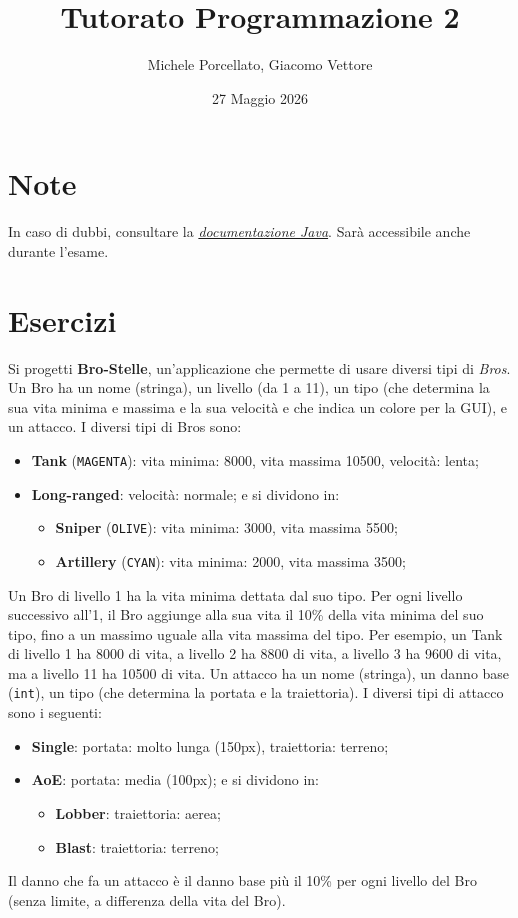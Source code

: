 \documentclass{article}
\title{Tutorato Programmazione 2}
\author{Michele Porcellato, Giacomo Vettore}
\date{27 Maggio 2026}
\begin{document}
\maketitle

\section{Note}
In caso di dubbi, consultare la \href{https://docs.oracle.com/en/java/javase/25/docs/api/index.html}{\textit{documentazione Java}}. Sarà accessibile anche durante l'esame.

\section{Esercizi}

Si progetti \textbf{Bro-Stelle}, un'applicazione che permette di usare diversi tipi di \textit{Bros}. Un Bro ha un nome (stringa), un livello (da 1 a 11), un tipo (che determina la sua vita minima e massima e la sua velocità e che indica un colore per la GUI), e un attacco. I diversi tipi di Bros sono:
\begin{itemize}
    \item \textbf{Tank} (\texttt{MAGENTA}): vita minima: 8000, vita massima 10500, velocità: lenta;
    \item \textbf{Long-ranged}: velocità: normale; e si dividono in:
    \begin{itemize}
        \item \textbf{Sniper} (\texttt{OLIVE}): vita minima: 3000, vita massima 5500;
        \item \textbf{Artillery} (\texttt{CYAN}): vita minima: 2000, vita massima 3500;
    \end{itemize}
\end{itemize}
Un Bro di livello 1 ha la vita minima dettata dal suo tipo. Per ogni livello successivo all'1, il Bro aggiunge alla sua vita il 10\% della vita minima del suo tipo, fino a un massimo uguale alla vita massima del tipo. Per esempio, un Tank di livello 1 ha 8000 di vita, a livello 2 ha 8800 di vita, a livello 3 ha 9600 di vita, ma a livello 11 ha 10500 di vita.
\newline
\newline
Un attacco ha un nome (stringa), un danno base (\texttt{int}), un tipo (che determina la portata e la traiettoria). I diversi tipi di attacco sono i seguenti:
\begin{itemize}
    \item \textbf{Single}: portata: molto lunga (150px), traiettoria: terreno;
    \item \textbf{AoE}: portata: media (100px); e si dividono in:
    \begin{itemize}
        \item \textbf{Lobber}: traiettoria: aerea;
        \item \textbf{Blast}: traiettoria: terreno;
    \end{itemize}
\end{itemize}
Il danno che fa un attacco è il danno base più il 10\% per ogni livello del Bro (senza limite, a differenza della vita del Bro).
\end{document}
